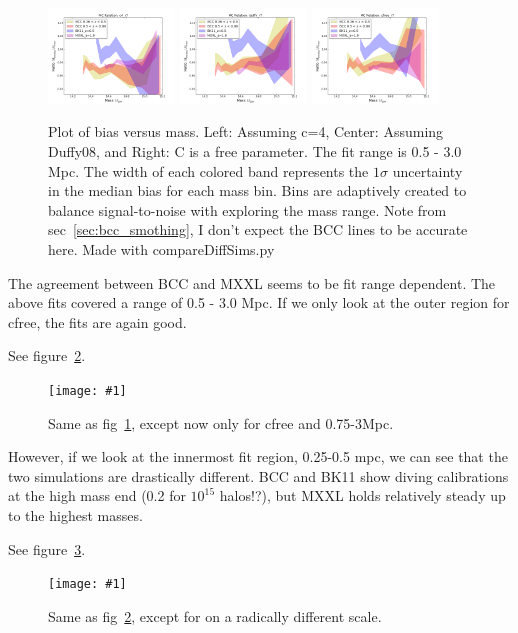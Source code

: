 \documentclass[11pt]{article}
\newcommand{\logfig}[2]{
See figure~\ref{fig:#1}.
\begin{figure}[!ht] 
\texttt{[image: \#1]} 
\caption{#2} 
\label{fig:#1} 
\end{figure}
}
\begin{document}
\begin{figure} \centering[!ht]
\includegraphics[width=0.3\textwidth]{figures/c4_r7}
\includegraphics[width=0.3\textwidth]{figures/duffy_r7}
\includegraphics[width=0.3\textwidth]{figures/cfree_r7}
\caption{Plot of bias versus mass. Left: Assuming c=4, Center: Assuming Duffy08, and Right: C is a free parameter. The fit range is 0.5 - 3.0 Mpc. The width of each colored band represents the $1\sigma$ uncertainty in the median bias for each mass bin. Bins are adaptively created to balance signal-to-noise with exploring the mass range. Note from sec~\ref{sec:bcc_smothing}, I don't expect the BCC lines to be accurate here. Made with compareDiffSims.py}
\label{fig:comparing_r7_bias}
\end{figure}

The agreement between BCC and MXXL seems to be fit range dependent. The above fits covered a range of 0.5 - 3.0 Mpc. If we only look at the outer region for cfree, the fits are again good.

\logfig{figures/cfree_r10}{Same as fig~\ref{fig:comparing_r7_bias}, except now only for cfree and 0.75-3Mpc.}

However, if we look at the innermost fit region, 0.25-0.5 mpc, we can see that the two simulations are drastically different. BCC and BK11 show diving calibrations at the high mass end (0.2 for $10^{15}$ halos!?), but MXXL holds relatively steady up to the highest masses. 

\logfig{figures/cfree_r1}{Same as fig~\ref{fig:figures/cfree_r10}, except for on a radically different scale.}
\end{document}

